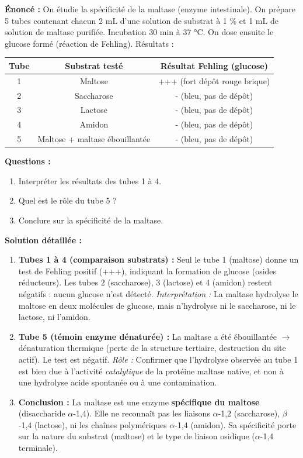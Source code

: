 \documentclass[11pt]{article}
\begin{document}
\begin{exoresolu}
\textbf{Énoncé :} On étudie la spécificité de la maltase (enzyme intestinale). On prépare 5 tubes contenant chacun 2 mL d'une solution de substrat à 1 \% et 1 mL de solution de maltase purifiée. Incubation 30 min à 37 °C. On dose ensuite le glucose formé (réaction de Fehling). Résultats :

\begin{center}
\begin{tabular}{|c|c|c|}\hline
Tube & Substrat testé & Résultat Fehling (glucose) \\ \hline
1 & Maltose & +++ (fort dépôt rouge brique) \\
2 & Saccharose & - (bleu, pas de dépôt) \\
3 & Lactose & - (bleu, pas de dépôt) \\
4 & Amidon & - (bleu, pas de dépôt) \\
5 & Maltose + maltase ébouillantée & - (bleu, pas de dépôt) \\ \hline
\end{tabular}
\end{center}

\textbf{Questions :}
\begin{enumerate}
    \item Interpréter les résultats des tubes 1 à 4.
    \item Quel est le rôle du tube 5 ?
    \item Conclure sur la spécificité de la maltase.
\end{enumerate}

\tcblower

\textbf{Solution détaillée :}

\begin{enumerate}
    \item \textbf{Tubes 1 à 4 (comparaison substrats) :} Seul le tube 1 (maltose) donne un test de Fehling positif (+++), indiquant la formation de glucose (osides réducteurs). Les tubes 2 (saccharose), 3 (lactose) et 4 (amidon) restent négatifs : aucun glucose n'est détecté. \emph{Interprétation :} La maltase hydrolyse le maltose en deux molécules de glucose, mais n'hydrolyse ni le saccharose, ni le lactose, ni l'amidon.
    \item \textbf{Tube 5 (témoin enzyme dénaturée) :} La maltase a été ébouillantée $\rightarrow$ dénaturation thermique (perte de la structure tertiaire, destruction du site actif). Le test est négatif. \emph{Rôle :} Confirmer que l'hydrolyse observée au tube 1 est bien due à l'activité \emph{catalytique} de la protéine maltase native, et non à une hydrolyse acide spontanée ou à une contamination.
    \item \textbf{Conclusion :} La maltase est une enzyme \textbf{spécifique du maltose} (disaccharide $\alpha$-1,4). Elle ne reconnaît pas les liaisons $\alpha$-1,2 (saccharose), $\beta$-1,4 (lactose), ni les chaînes polymériques $\alpha$-1,4 (amidon). Sa spécificité porte sur la nature du substrat (maltose) et le type de liaison osidique ($\alpha$-1,4 terminale).
\end{enumerate}
\end{exoresolu}
\end{document}
